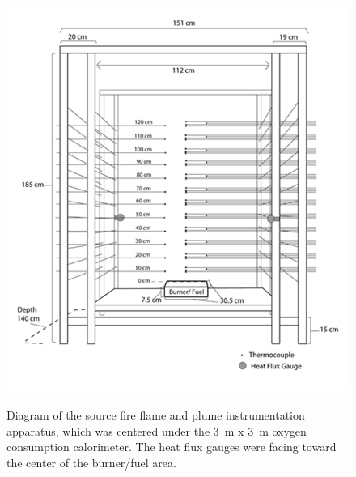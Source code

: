 \documentclass[twoside]{uocthesis}
\begin{document}
{\begin{figure}
  \centering
  \includegraphics[width=\textwidth]{../Figures/Schematic_Drawing}\\
  \caption[Diagram of the source fire flame and plume instrumentation apparatus]{Diagram of the source fire flame and plume instrumentation apparatus, which was centered under the 3~m x 3~m oxygen consumption calorimeter.  The heat flux gauges were facing toward the center of the burner/fuel area.}
  \label{Drawing_Fire_Flamer}
\end{figure}

}
\end{document}
